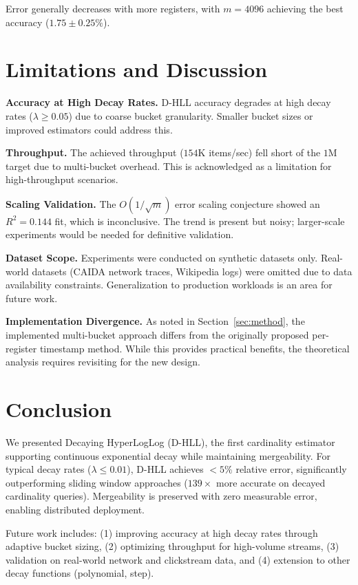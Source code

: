 \documentclass{article}
\begin{document}
Error generally decreases with more registers, with $m=4096$ achieving the best accuracy ($1.75\pm0.25\%$).

\section{Limitations and Discussion}\label{sec:limitations}

\textbf{Accuracy at High Decay Rates.}
D-HLL accuracy degrades at high decay rates ($\lambda \geq 0.05$) due to coarse bucket granularity. Smaller bucket sizes or improved estimators could address this.

\textbf{Throughput.}
The achieved throughput ($154$K items/sec) fell short of the $1$M target due to multi-bucket overhead. This is acknowledged as a limitation for high-throughput scenarios.

\textbf{Scaling Validation.}
The $O(1/\sqrt{m})$ error scaling conjecture showed an $R^2 = 0.144$ fit, which is inconclusive. The trend is present but noisy; larger-scale experiments would be needed for definitive validation.

\textbf{Dataset Scope.}
Experiments were conducted on synthetic datasets only. Real-world datasets (CAIDA network traces, Wikipedia logs) were omitted due to data availability constraints. Generalization to production workloads is an area for future work.

\textbf{Implementation Divergence.}
As noted in Section~\ref{sec:method}, the implemented multi-bucket approach differs from the originally proposed per-register timestamp method. While this provides practical benefits, the theoretical analysis requires revisiting for the new design.

\section{Conclusion}\label{sec:conclusion}

We presented Decaying HyperLogLog (D-HLL), the first cardinality estimator supporting continuous exponential decay while maintaining mergeability. For typical decay rates ($\lambda \leq 0.01$), D-HLL achieves $<5\%$ relative error, significantly outperforming sliding window approaches ($139\times$ more accurate on decayed cardinality queries). Mergeability is preserved with zero measurable error, enabling distributed deployment.

Future work includes: (1) improving accuracy at high decay rates through adaptive bucket sizing, (2) optimizing throughput for high-volume streams, (3) validation on real-world network and clickstream data, and (4) extension to other decay functions (polynomial, step).
\end{document}
